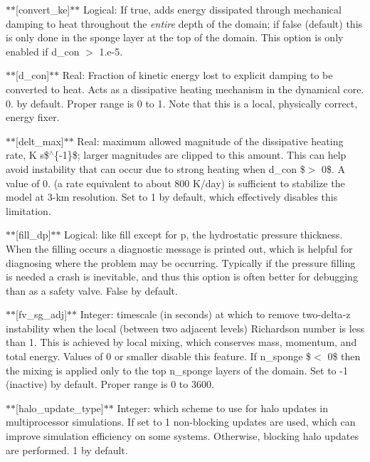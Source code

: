 $\ast$$\ast$\mbox{[}convert\-\_\-ke\mbox{]}$\ast$$\ast$ Logical\-: If true, adds energy dissipated through mechanical damping to heat throughout the {\itshape entire} depth of the domain; if false (default) this is only done in the sponge layer at the top of the domain. This option is only enabled if d\-\_\-con $>$ 1.\-e-\/5.

$\ast$$\ast$\mbox{[}d\-\_\-con\mbox{]}$\ast$$\ast$ Real\-: Fraction of kinetic energy lost to explicit damping to be converted to heat. Acts as a dissipative heating mechanism in the dynamical core. 0. by default. Proper range is 0 to 1. Note that this is a local, physically correct, energy fixer.

$\ast$$\ast$\mbox{[}delt\-\_\-max\mbox{]}$\ast$$\ast$ Real\-: maximum allowed magnitude of the dissipative heating rate, K s\$$^\wedge$\{-\/1\}\$; larger magnitudes are clipped to this amount. This can help avoid instability that can occur due to strong heating when d\-\_\-con \$$>$ 0\$. A value of 0. (a rate equivalent to about 800 K/day) is sufficient to stabilize the model at 3-\/km resolution. Set to 1 by default, which effectively disables this limitation.

$\ast$$\ast$\mbox{[}fill\-\_\-dp\mbox{]}$\ast$$\ast$ Logical\-: like fill except for {\ttfamily p}, the hydrostatic pressure thickness. When the filling occurs a diagnostic message is printed out, which is helpful for diagnosing where the problem may be occurring. Typically if the pressure filling is needed a crash is inevitable, and thus this option is often better for debugging than as a safety valve. False by default.

$\ast$$\ast$\mbox{[}fv\-\_\-sg\-\_\-adj\mbox{]}$\ast$$\ast$ Integer\-: timescale (in seconds) at which to remove two-\/delta-\/z instability when the local (between two adjacent levels) Richardson number is less than 1. This is achieved by local mixing, which conserves mass, momentum, and total energy. Values of 0 or smaller disable this feature. If n\-\_\-sponge \$$<$ 0\$ then the mixing is applied only to the top n\-\_\-sponge layers of the domain. Set to -\/1 (inactive) by default. Proper range is 0 to 3600.

$\ast$$\ast$\mbox{[}halo\-\_\-update\-\_\-type\mbox{]}$\ast$$\ast$ Integer\-: which scheme to use for halo updates in multiprocessor simulations. If set to 1 non-\/blocking updates are used, which can improve simulation efficiency on some systems. Otherwise, blocking halo updates are performed. 1 by default.

